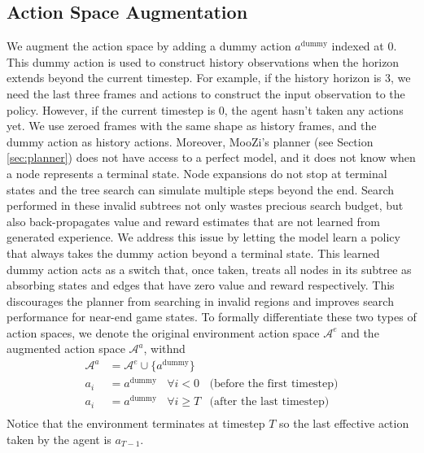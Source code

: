 \subsection{Action Space Augmentation} \label{sec:a_aug}
We augment the action space by adding a dummy action $a^\text{dummy}$ indexed at 0.
This dummy action is used to construct history observations when the horizon extends beyond the current timestep.
For example, if the history horizon is 3, we need the last three frames and actions to construct the input observation to the policy.
However, if the current timestep is 0, the agent hasn't taken any actions yet.
We use zeroed frames with the same shape as history frames, and the dummy action as history actions.
Moreover, MooZi's planner (see Section \ref{sec:planner}) does not have access to a perfect model, and it does not know when a node represents a terminal state.
Node expansions do not stop at terminal states and the tree search can simulate multiple steps beyond the end.
Search performed in these invalid subtrees not only wastes precious search budget, but also back-propagates value and reward estimates that are not learned from generated experience.
We address this issue by letting the model learn a policy that always takes the dummy action beyond a terminal state.
This learned dummy action acts as a switch that, once taken, treats all nodes in its subtree as absorbing states and edges that have zero value and reward respectively.
This discourages the planner from searching in invalid regions and improves search performance for near-end game states.
To formally differentiate these two types of action spaces, we denote the original environment action space $\mathcal{A}^e$ and the augmented action space $\mathcal{A}^a$, withnd
\begin{align*}
    \mathcal{A}^a  & = \mathcal{A}^e \cup \lbrace a^\text{dummy} \rbrace  \\
    a_{i}          & = a^\text{dummy} ~~~~ \forall i < 0                  & \text{(before the first timestep)}  \\
    a_{i}          & = a^\text{dummy} ~~~~ \forall i \geq T               & \text{(after the last timestep)}  \\
\end{align*}
Notice that the environment terminates at timestep $T$ so the last effective action taken by the agent is $a_{T-1}$.

